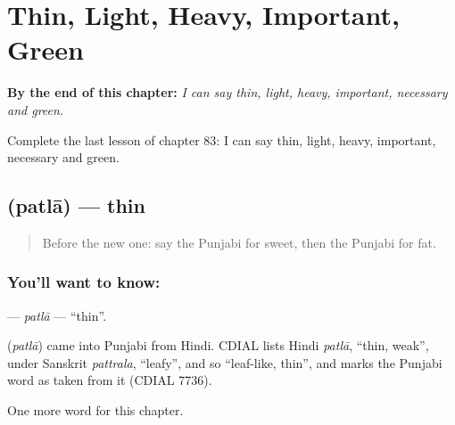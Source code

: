 
\chapter{Thin, Light, Heavy, Important, Green}
\label{ch:pa-thin-light-heavy-important-green}

\begin{chapteropening}
\textbf{By the end of this chapter:} \emph{I can say thin, light, heavy, important, necessary and green.}

Complete the last lesson of chapter 83: I can say thin, light, heavy, important, necessary and green.
\end{chapteropening}

\section[\texorpdfstring{\pa{ਪਤਲਾ} (patlā)}{ਪਤਲਾ (patlā)}]{ (patlā) — thin}

\label{lesson:PA-C83-patla}



\begin{quote}
Before the new one: say the Punjabi for sweet, then the Punjabi for fat.
\end{quote}

\subsection*{You'll want to know: }
\textbf{} — \emph{patlā} — \textquotedblleft{}thin\textquotedblright{}.

\begin{cousinweb}
\textbf{} (\emph{patlā}) came into Punjabi from Hindi. CDIAL lists Hindi \emph{patlā}, \textquotedblleft{}thin, weak\textquotedblright{}, under Sanskrit \emph{pattrala}, \textquotedblleft{}leafy\textquotedblright{}, and so \textquotedblleft{}leaf-like, thin\textquotedblright{}, and marks the Punjabi word as taken from it (CDIAL 7736).
\end{cousinweb}

\begin{grammarlens}[title={What you've built}]
One more word for this chapter.
\end{grammarlens}

